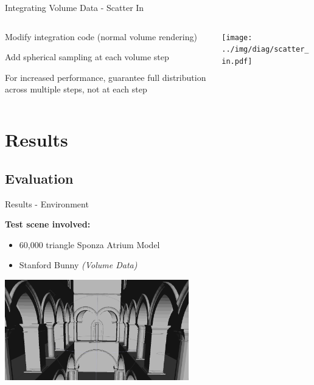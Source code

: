 \documentclass[10pt,compress,professionalfont]{beamer}
\begin{document}
\begin{frame}{Integrating Volume Data - Scatter In}

    \begin{columns}
        \begin{column}{0.5\textwidth}

            Modify integration code (normal volume rendering)\\
            \vspace{8mm}

            Add spherical sampling at each volume step\\
            \vspace{8mm}

            For increased performance, guarantee full distribution across multiple steps, not at each step

        \end{column}
        \begin{column}{0.5\textwidth}
            \texttt{[image: ../img/diag/scatter\_in.pdf]}\\
        \end{column}
    \end{columns}

\end{frame}




\section{Results}
\subsection{Evaluation}
\begin{frame}{Results - Environment}

    {\bf Test scene involved:}
    \begin{itemize}
        \item 60,000 triangle Sponza Atrium Model\\
        \vspace{2mm}
        \item Stanford Bunny \textit{(Volume Data)}
    \end{itemize}
    \vspace{10mm}
    {\centering
    \includegraphics[width=80mm]{../img/sponza_vis}\\
    }

\end{frame}
\end{document}

